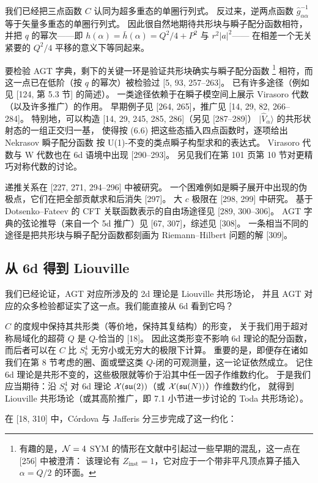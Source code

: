 我们已经把三点函数 $C$ 认同为超多重态的单圈行列式。
反过来，逆两点函数 $\widehat{g}^{-1}_{\alpha\alpha}$ 等于矢量多重态的单圈行列式。
因此很自然地期待共形块与瞬子配分函数相符，
并把 $q$ 的幂次------即 $h(\alpha)=\bar h(\alpha)=Q^2/4+P^2$ 与 $r^2|a|^2$------
在相差一个无关紧要的 $Q^2/4$ 平移的意义下等同起来。


要检验 AGT 字典，剩下的关键一环是验证共形块确实与瞬子配分函数
\footnote{有趣的是，$\mathcal{N}=4$ SYM 的情形在文献中引起过一些早期的混乱，这一点在 [256] 中被澄清：
该理论有 $Z_{\text{inst}}=1$，它对应于一个带非平凡顶点算子插入 $\alpha=Q/2$ 的环面。}
相符，而这一点已在低阶（按 $q$ 的幂次）被检验过 [5, 93, 257--263]。
已有许多途径（例如见 [124, 第 5.3 节] 的简述）。
一类途径依赖于在瞬子模空间上展示 Virasoro 代数（以及许多推广）的作用。
早期例子见 [264, 265]，推广见 [14, 29, 82, 266--284]。
特别地，可以构造 [14, 29, 245, 285, 286]（另见 [287--289]）
$|\widehat{V}_\alpha\rangle$ 的共形状射态的一组正交归一基，
使得按 (6.6) 把这些态插入四点函数时，逐项给出 Nekrasov 瞬子配分函数
按 U(1)-不变的类点瞬子构型求和的表达式。
Virasoro 代数与 W 代数也在 6d 语境中出现 [290--293]。
另见我们在第 101 页第 10 节对更精巧对称代数的讨论。

递推关系在 [227, 271, 294--296] 中被研究。
一个困难例如是瞬子展开中出现的伪极点，它们在把全部贡献求和后消失 [297]。
大 $c$ 极限在 [298, 299] 中研究。
基于 Dotsenko--Fateev 的 CFT 关联函数表示的自由场途径见 [289, 300--306]。
AGT 字典的弦论推导（来自一个 5d 推广）见 [67, 307]，综述见 [308]。
一条相当不同的途径是把共形块与瞬子配分函数都刻画为 Riemann--Hilbert 问题的解 [309]。

\subsection{从 6d 得到 Liouville}

我们已经论证，AGT 对应所涉及的 2d 理论是 Liouville 共形场论，
并且 AGT 对应的众多检验都证实了这一点。我们能直接从 6d 看到它吗？

$C$ 的度规中保持其共形类（等价地，保持其复结构）的形变，
关于我们用于超对称局域化的超荷 $Q$ 是 $Q$-恰当的 [18]。
因此这类形变不影响 6d 理论的配分函数，
而后者可以在 $C$ 比 $S^4_b$ 无穷小或无穷大的极限下计算。
重要的是，即便存在诸如我们在第 8 节考虑的圈、面或壁这类 $Q$-闭的可观测量，这一论证依然成立。
记住 6d 理论是共形不变的，这些极限就等价于沿其中任一因子作维数约化。
于是我们应当期待：沿 $S^4_b$ 对 6d 理论 $\mathcal{X}(\mathfrak{su}(2))$（或 $\mathcal{X}(\mathfrak{su}(N))$）作维数约化，
就得到 Liouville 共形场论（或其高阶推广，即 7.1 小节进一步讨论的 Toda 共形场论）。

在 [18, 310] 中，Córdova 与 Jafferis 分三步完成了这一约化：
